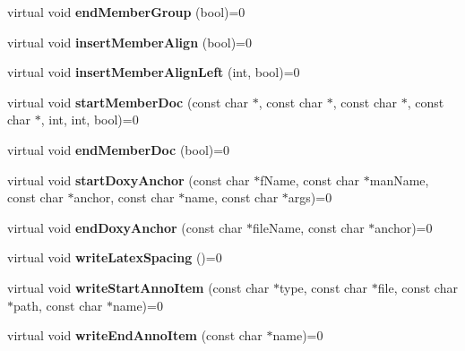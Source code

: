 \begin{DoxyCompactItemize}
virtual void {\bfseries end\+Member\+Group} (bool)=0
\item 
\mbox{\label{class_output_generator_a0df59cf6b0b238b48b139c7bfe5fb901}} 
virtual void {\bfseries insert\+Member\+Align} (bool)=0
\item 
\mbox{\label{class_output_generator_aa5b3dd4d04afcedc0109f7a21f05216c}} 
virtual void {\bfseries insert\+Member\+Align\+Left} (int, bool)=0
\item 
\mbox{\label{class_output_generator_a7610e3caf9ac099156dbc016259b24b3}} 
virtual void {\bfseries start\+Member\+Doc} (const char $\ast$, const char $\ast$, const char $\ast$, const char $\ast$, int, int, bool)=0
\item 
\mbox{\label{class_output_generator_adcab4ec924ae47924fdc3492a06d432b}} 
virtual void {\bfseries end\+Member\+Doc} (bool)=0
\item 
\mbox{\label{class_output_generator_ace0718073cbb95ce1908405e6eda095b}} 
virtual void {\bfseries start\+Doxy\+Anchor} (const char $\ast$f\+Name, const char $\ast$man\+Name, const char $\ast$anchor, const char $\ast$name, const char $\ast$args)=0
\item 
\mbox{\label{class_output_generator_a59ba4ed87cf4c2bb55f231679d52268a}} 
virtual void {\bfseries end\+Doxy\+Anchor} (const char $\ast$file\+Name, const char $\ast$anchor)=0
\item 
\mbox{\label{class_output_generator_afcb9acfea2d7a6f0a340287632aea4e8}} 
virtual void {\bfseries write\+Latex\+Spacing} ()=0
\item 
\mbox{\label{class_output_generator_a2b0f7e8400fa8bfa7b973ed25f2c4366}} 
virtual void {\bfseries write\+Start\+Anno\+Item} (const char $\ast$type, const char $\ast$file, const char $\ast$path, const char $\ast$name)=0
\item 
\mbox{\label{class_output_generator_a29c6763f7d6f708fc5d3e7dc2c0ce1f4}} 
virtual void {\bfseries write\+End\+Anno\+Item} (const char $\ast$name)=0

\end{DoxyCompactItemize}
